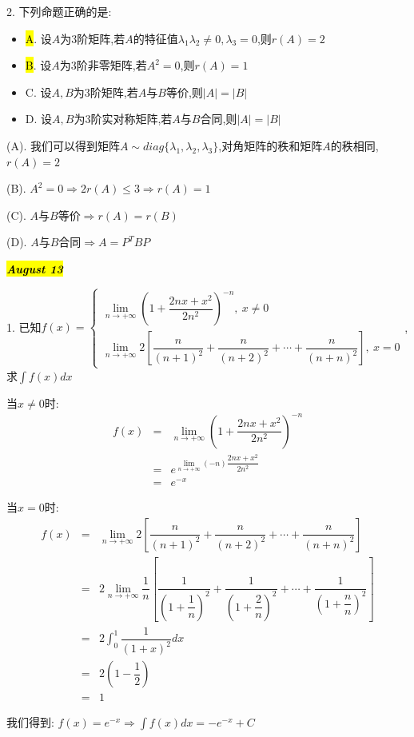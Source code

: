 2. 下列命题正确的是:  
\begin{itemize}
	\item \hl{A}. 设$A$为$3$阶矩阵,若$A$的特征值$\lambda_{1}\lambda_{2}\neq 0,\lambda_{3}=0$,则$r(A)=2$
	\item \hl{B}. 设$A$为$3$阶非零矩阵,若$A^2=0$,则$r(A)=1$
	\item C. 设$A,B$为$3$阶矩阵,若$A$与$B$等价,则$|A|=|B|$
	\item D. 设$A,B$为$3$阶实对称矩阵,若$A$与$B$合同,则$|A|=|B|$
\end{itemize}
\begin{solution}

	(A). 我们可以得到矩阵$A\sim diag\{\lambda_{1},\lambda_{2},\lambda_{3}\}$,对角矩阵的秩和矩阵$A$的秩相同,$r(A)=2$
	
	(B). $A^2=0\Rightarrow 2r(A)\leq 3\Rightarrow r(A)=1$
	
	(C). $A$与$B$等价$\Rightarrow r(A)=r(B)$
	
	(D). $A$与$B$合同$\Rightarrow A=P^{T}BP$
\end{solution}

\hl{\textbf{\textit{August 13}}}

1. 已知$f(x)=\left\lbrace
\begin{array}{l}
	\lim\limits_{n\rightarrow +\infty}\left( 1+\dfrac{2nx+x^2}{2n^2}\right)^{-n},\ x\neq 0\\
	\lim\limits_{n\rightarrow +\infty}2\left[ \dfrac{n}{(n+1)^2}+\dfrac{n}{(n+2)^2}+\cdots+\dfrac{n}{(n+n)^2}\right],\ x=0  
\end{array}
\right. $,求$\int f(x)dx$
\begin{solution}

	当$x\neq 0$时:  
	\begin{eqnarray*}
		f(x)&=&\lim\limits_{n\rightarrow +\infty}\left( 1+\dfrac{2nx+x^2}{2n^2}\right)^{-n}\\
		&=&e^{\lim\limits_{n\rightarrow +\infty}(-n)\dfrac{2nx+x^2}{2n^2}}\\
		&=&e^{-x}
	\end{eqnarray*}

	当$x=0$时:  
	\begin{eqnarray*}
		f(x)&=&\lim\limits_{n\rightarrow +\infty}2\left[ \dfrac{n}{(n+1)^2}+\dfrac{n}{(n+2)^2}+\cdots+\dfrac{n}{(n+n)^2}\right]\\
		&=&2\lim\limits_{n\rightarrow +\infty}\dfrac{1}{n}\left[ \dfrac{1}{(1+\dfrac{1}{n})^2}+\dfrac{1}{(1+\dfrac{2}{n})^2}+\cdots+\dfrac{1}{(1+\dfrac{n}{n})^2}\right]\\
		&=&2\int_{0}^{1}\dfrac{1}{(1+x)^2}dx\\
		&=&2(1-\dfrac{1}{2})\\
		&=&1
	\end{eqnarray*}

	我们得到:  $f(x)=e^{-x}\Rightarrow \int f(x)dx=-e^{-x}+C$
\end{solution}

